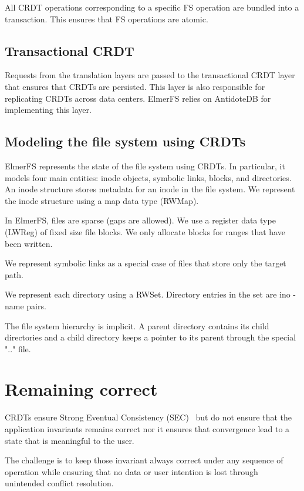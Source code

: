 \documentclass[sigconf,anonymous,10pt]{acmart}
\begin{document}
All CRDT operations corresponding to a specific FS operation are bundled into
a transaction. This ensures that FS operations are atomic.

\subsection{Transactional CRDT}

Requests from the translation layers are passed to the transactional CRDT
layer that ensures that CRDTs are persisted.
This layer is also responsible for replicating CRDTs across data centers.
ElmerFS relies on AntidoteDB for implementing this layer.

\subsection{Modeling the file system using CRDTs}

ElmerFS represents the state of the file system using CRDTs.
In particular, it models four main entities: inode objects,
symbolic links, blocks, and directories.
An inode structure stores metadata for an inode in the file system.
We represent the inode structure using a map data type (RWMap).

In ElmerFS, files are sparse (gaps are allowed).
We use a register data type (LWReg) of fixed size file blocks.
We only allocate blocks for ranges that have been written.

We represent symbolic links as a special case of files that store only
the target path.

We represent each directory using a RWSet. Directory entries in the set are
ino - name pairs.

The file system hierarchy is implicit. A parent directory contains its child
directories and a child directory keeps a pointer to its parent through
the special ".." file.

\section{Remaining correct}

CRDTs ensure Strong Eventual Consistency (SEC)~\cite{shapiro2011conflict} but
do not ensure that the application invariants remains correct
nor it ensures that convergence lead to a state that is meaningful
to the user.

The challenge is to keep those invariant always correct under any sequence
of operation while ensuring that no data or user intention is lost through
unintended conflict resolution.
\end{document}
